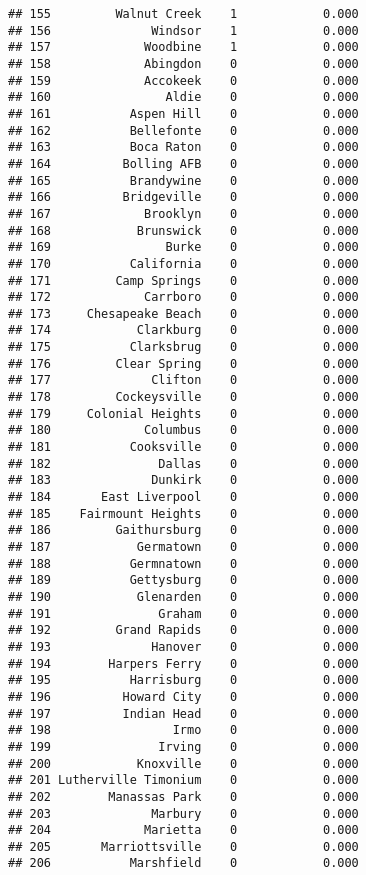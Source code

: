 \documentclass[]{article}
\begin{document}
\begin{verbatim}
## 155         Walnut Creek    1            0.000
## 156              Windsor    1            0.000
## 157             Woodbine    1            0.000
## 158             Abingdon    0            0.000
## 159             Accokeek    0            0.000
## 160                Aldie    0            0.000
## 161           Aspen Hill    0            0.000
## 162           Bellefonte    0            0.000
## 163           Boca Raton    0            0.000
## 164          Bolling AFB    0            0.000
## 165           Brandywine    0            0.000
## 166          Bridgeville    0            0.000
## 167             Brooklyn    0            0.000
## 168            Brunswick    0            0.000
## 169                Burke    0            0.000
## 170           California    0            0.000
## 171         Camp Springs    0            0.000
## 172             Carrboro    0            0.000
## 173     Chesapeake Beach    0            0.000
## 174            Clarkburg    0            0.000
## 175           Clarksbrug    0            0.000
## 176         Clear Spring    0            0.000
## 177              Clifton    0            0.000
## 178         Cockeysville    0            0.000
## 179     Colonial Heights    0            0.000
## 180             Columbus    0            0.000
## 181           Cooksville    0            0.000
## 182               Dallas    0            0.000
## 183              Dunkirk    0            0.000
## 184       East Liverpool    0            0.000
## 185    Fairmount Heights    0            0.000
## 186         Gaithursburg    0            0.000
## 187            Germatown    0            0.000
## 188           Germnatown    0            0.000
## 189           Gettysburg    0            0.000
## 190            Glenarden    0            0.000
## 191               Graham    0            0.000
## 192         Grand Rapids    0            0.000
## 193              Hanover    0            0.000
## 194        Harpers Ferry    0            0.000
## 195           Harrisburg    0            0.000
## 196          Howard City    0            0.000
## 197          Indian Head    0            0.000
## 198                 Irmo    0            0.000
## 199               Irving    0            0.000
## 200            Knoxville    0            0.000
## 201 Lutherville Timonium    0            0.000
## 202        Manassas Park    0            0.000
## 203              Marbury    0            0.000
## 204             Marietta    0            0.000
## 205       Marriottsville    0            0.000
## 206           Marshfield    0            0.000

\end{verbatim}
\end{document}
